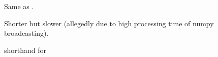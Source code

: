 \documentclass[letterpaper,10pt,english,openany,oneside]{sphinxmanual}
\begin{document}
\begin{fulllineitems}
\begin{fulllineitems}
\begin{quote}
\begin{description}
\end{description}\end{quote}

\end{fulllineitems}


\begin{fulllineitems}
\label{\detokenize{autogen:model.Model.new_is_inside_bounds}}
Same as .

Shorter but slower (allegedly due to high processing time of numpy broadcasting).

\end{fulllineitems}


\begin{fulllineitems}
\label{\detokenize{autogen:model.Model.pointshape}}
 shorthand for 

\end{fulllineitems}


\end{fulllineitems}

\end{document}
